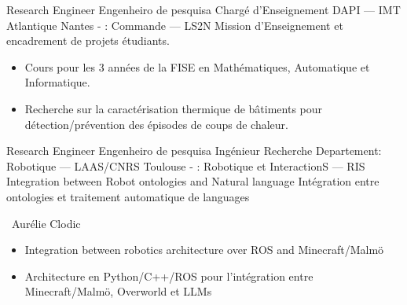 \cventry{\sep\ 2024 \newline \aug\ 2025\newline}
{
  \ml
  {Research Engineer}
  {Engenheiro de pesquisa}
  {Chargé d'Enseignement}%
}
{\newline DAPI --- IMT Atlantique}
{\newline Nantes - \france
\newline{}: Commande --- LS2N}%
{\newline Mission d'Enseignement et encadrement de projets étudiants.
}
{
  \begin{itemize}
    \item Cours pour les 3 années de la FISE en Mathématiques, Automatique et Informatique.
    \item Recherche sur la caractérisation thermique de bâtiments pour détection/prévention des épisodes de coups de chaleur.
  \end{itemize}
}

\cventry{\jun\ 2024 \newline \nov\ 2024\newline}
{
  \ml
  {Research Engineer}
  {Engenheiro de pesquisa}
  {Ingénieur Recherche}%
}
{\newline Departement: Robotique --- LAAS/CNRS}
{\newline Toulouse - \france
\newline{}: Robotique et InteractionS --- RIS}%
{\newline
  \ml
  {Integration between Robot ontologies and Natural language}
  {}
  {Intégration entre ontologies et traitement automatique de languages}
}
{
  \supervisor\ Aurélie Clodic
  \ml
  {
    \begin{itemize}
      \item Integration between robotics architecture over ROS and Minecraft/Malmö
    \end{itemize}
  }
  {}
  {\begin{itemize}
    \item Architecture en Python/C++/ROS pour l'intégration entre Minecraft/Malmö,
           Overworld et LLMs
  \end{itemize}
  }
}

